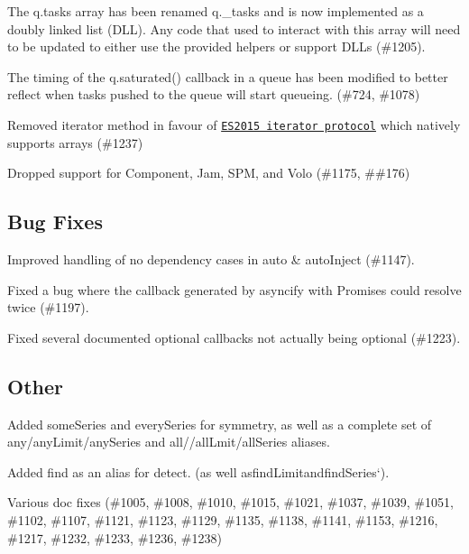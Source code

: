 \begin{DoxyItemize}
\item The {\ttfamily q.\+tasks} array has been renamed {\ttfamily q.\+\_\+tasks} and is now implemented as a doubly linked list (D\+LL). Any code that used to interact with this array will need to be updated to either use the provided helpers or support D\+L\+Ls (\#1205).
\item The timing of the {\ttfamily q.\+saturated()} callback in a {\ttfamily queue} has been modified to better reflect when tasks pushed to the queue will start queueing. (\#724, \#1078)
\item Removed {\ttfamily iterator} method in favour of \href{https://developer.mozilla.org/en-US/docs/Web/JavaScript/Guide/Iterators_and_Generators}{\tt E\+S2015 iterator protocol} which natively supports arrays (\#1237)
\item Dropped support for Component, Jam, S\+PM, and Volo (\#1175, \#\#176)
\end{DoxyItemize}

\subsection*{Bug Fixes}


\begin{DoxyItemize}
\item Improved handling of no dependency cases in {\ttfamily auto} \& {\ttfamily auto\+Inject} (\#1147).
\item Fixed a bug where the callback generated by {\ttfamily asyncify} with {\ttfamily Promises} could resolve twice (\#1197).
\item Fixed several documented optional callbacks not actually being optional (\#1223).
\end{DoxyItemize}

\subsection*{Other}


\begin{DoxyItemize}
\item Added {\ttfamily some\+Series} and {\ttfamily every\+Series} for symmetry, as well as a complete set of {\ttfamily any}/{\ttfamily any\+Limit}/{\ttfamily any\+Series} and {\ttfamily all}/{\ttfamily /all\+Lmit}/{\ttfamily all\+Series} aliases.
\item Added {\ttfamily find} as an alias for {\ttfamily detect. (as well as}find\+Limit{\ttfamily and}find\+Series`).
\item Various doc fixes (\#1005, \#1008, \#1010, \#1015, \#1021, \#1037, \#1039, \#1051, \#1102, \#1107, \#1121, \#1123, \#1129, \#1135, \#1138, \#1141, \#1153, \#1216, \#1217, \#1232, \#1233, \#1236, \#1238)
\end{DoxyItemize}

